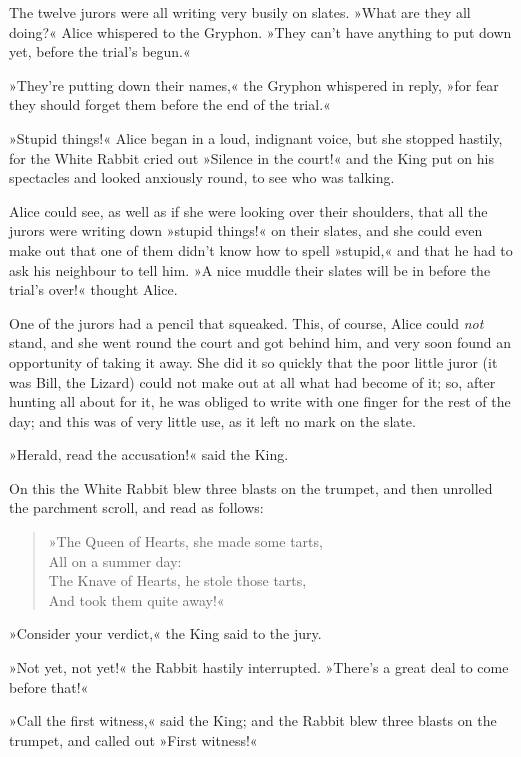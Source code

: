 The twelve jurors were all writing very busily on slates. »What are they all doing?« Alice whispered to the Gryphon. »They can't have anything to put down yet, before the trial's begun.«

»They're putting down their names,« the Gryphon whispered in reply, »for fear they should forget them before the end of the trial.«

»Stupid things!« Alice began in a loud, indignant voice, but she stopped hastily, for the White Rabbit cried out »Silence in the court!« and the King put on his spectacles and looked anxiously round, to see who was talking.

Alice could see, as well as if she were looking over their shoulders, that all the jurors were writing down »stupid things!« on their slates, and she could even make out that one of them didn't know how to spell »stupid,« and that he had to ask his neighbour to tell him. »A nice muddle their slates will be in before the trial's over!« thought Alice.

One of the jurors had a pencil that squeaked. This, of course, Alice could \textit{not} stand, and she went round the court and got behind him, and very soon found an opportunity of taking it away. She did it so quickly that the poor little juror (it was Bill, the Lizard) could not make out at all what had become of it; so, after hunting all about for it, he was obliged to write with one finger for the rest of the day; and this was of very little use, as it left no mark on the slate.

»Herald, read the accusation!« said the King.

On this the White Rabbit blew three blasts on the trumpet, and then unrolled the parchment scroll, and read as follows:

\begin{verse}
	\begin{altverse}
»The Queen of Hearts, she made some tarts,\\
All on a summer day:\\
The Knave of Hearts, he stole those tarts,\\
And took them quite away!«
\end{altverse}
\end{verse}

»Consider your verdict,« the King said to the jury.

»Not yet, not yet!« the Rabbit hastily interrupted. »There's a great deal to come before that!«

»Call the first witness,« said the King; and the Rabbit blew three blasts on the trumpet, and called out »First witness!«

